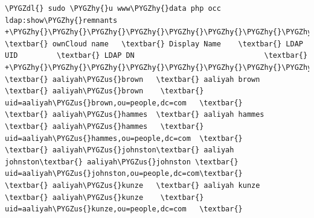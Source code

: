 \documentclass[letterpaper,10pt,english]{sphinxmanual}
\def\PYGZus{\char`\_}
\def\PYGZdl{\char`\$}
\def\PYGZhy{\char`\-}
\begin{document}
\begin{Verbatim}[commandchars=\\\{\}]
\PYGZdl{} sudo \PYGZhy{}u www\PYGZhy{}data php occ ldap:show\PYGZhy{}remnants
+\PYGZhy{}\PYGZhy{}\PYGZhy{}\PYGZhy{}\PYGZhy{}\PYGZhy{}\PYGZhy{}\PYGZhy{}\PYGZhy{}\PYGZhy{}\PYGZhy{}\PYGZhy{}\PYGZhy{}\PYGZhy{}\PYGZhy{}\PYGZhy{}\PYGZhy{}+\PYGZhy{}\PYGZhy{}\PYGZhy{}\PYGZhy{}\PYGZhy{}\PYGZhy{}\PYGZhy{}\PYGZhy{}\PYGZhy{}\PYGZhy{}\PYGZhy{}\PYGZhy{}\PYGZhy{}\PYGZhy{}\PYGZhy{}\PYGZhy{}\PYGZhy{}+\PYGZhy{}\PYGZhy{}\PYGZhy{}\PYGZhy{}\PYGZhy{}\PYGZhy{}\PYGZhy{}\PYGZhy{}\PYGZhy{}\PYGZhy{}\PYGZhy{}\PYGZhy{}\PYGZhy{}\PYGZhy{}\PYGZhy{}\PYGZhy{}\PYGZhy{}\PYGZhy{}+\PYGZhy{}\PYGZhy{}\PYGZhy{}\PYGZhy{}\PYGZhy{}\PYGZhy{}\PYGZhy{}\PYGZhy{}\PYGZhy{}\PYGZhy{}\PYGZhy{}\PYGZhy{}\PYGZhy{}\PYGZhy{}\PYGZhy{}\PYGZhy{}\PYGZhy{}\PYGZhy{}\PYGZhy{}\PYGZhy{}\PYGZhy{}\PYGZhy{}\PYGZhy{}\PYGZhy{}\PYGZhy{}\PYGZhy{}\PYGZhy{}\PYGZhy{}\PYGZhy{}\PYGZhy{}\PYGZhy{}\PYGZhy{}\PYGZhy{}\PYGZhy{}\PYGZhy{}\PYGZhy{}\PYGZhy{}\PYGZhy{}+
\textbar{} ownCloud name   \textbar{} Display Name    \textbar{} LDAP UID         \textbar{} LDAP DN                              \textbar{}
+\PYGZhy{}\PYGZhy{}\PYGZhy{}\PYGZhy{}\PYGZhy{}\PYGZhy{}\PYGZhy{}\PYGZhy{}\PYGZhy{}\PYGZhy{}\PYGZhy{}\PYGZhy{}\PYGZhy{}\PYGZhy{}\PYGZhy{}\PYGZhy{}\PYGZhy{}+\PYGZhy{}\PYGZhy{}\PYGZhy{}\PYGZhy{}\PYGZhy{}\PYGZhy{}\PYGZhy{}\PYGZhy{}\PYGZhy{}\PYGZhy{}\PYGZhy{}\PYGZhy{}\PYGZhy{}\PYGZhy{}\PYGZhy{}\PYGZhy{}\PYGZhy{}+\PYGZhy{}\PYGZhy{}\PYGZhy{}\PYGZhy{}\PYGZhy{}\PYGZhy{}\PYGZhy{}\PYGZhy{}\PYGZhy{}\PYGZhy{}\PYGZhy{}\PYGZhy{}\PYGZhy{}\PYGZhy{}\PYGZhy{}\PYGZhy{}\PYGZhy{}\PYGZhy{}+\PYGZhy{}\PYGZhy{}\PYGZhy{}\PYGZhy{}\PYGZhy{}\PYGZhy{}\PYGZhy{}\PYGZhy{}\PYGZhy{}\PYGZhy{}\PYGZhy{}\PYGZhy{}\PYGZhy{}\PYGZhy{}\PYGZhy{}\PYGZhy{}\PYGZhy{}\PYGZhy{}\PYGZhy{}\PYGZhy{}\PYGZhy{}\PYGZhy{}\PYGZhy{}\PYGZhy{}\PYGZhy{}\PYGZhy{}\PYGZhy{}\PYGZhy{}\PYGZhy{}\PYGZhy{}\PYGZhy{}\PYGZhy{}\PYGZhy{}\PYGZhy{}\PYGZhy{}\PYGZhy{}\PYGZhy{}\PYGZhy{}+
\textbar{} aaliyah\PYGZus{}brown   \textbar{} aaliyah brown   \textbar{} aaliyah\PYGZus{}brown    \textbar{} uid=aaliyah\PYGZus{}brown,ou=people,dc=com   \textbar{}
\textbar{} aaliyah\PYGZus{}hammes  \textbar{} aaliyah hammes  \textbar{} aaliyah\PYGZus{}hammes   \textbar{} uid=aaliyah\PYGZus{}hammes,ou=people,dc=com  \textbar{}
\textbar{} aaliyah\PYGZus{}johnston\textbar{} aaliyah johnston\textbar{} aaliyah\PYGZus{}johnston \textbar{} uid=aaliyah\PYGZus{}johnston,ou=people,dc=com\textbar{}
\textbar{} aaliyah\PYGZus{}kunze   \textbar{} aaliyah kunze   \textbar{} aaliyah\PYGZus{}kunze    \textbar{} uid=aaliyah\PYGZus{}kunze,ou=people,dc=com   \textbar{}

\end{Verbatim}
\end{document}
